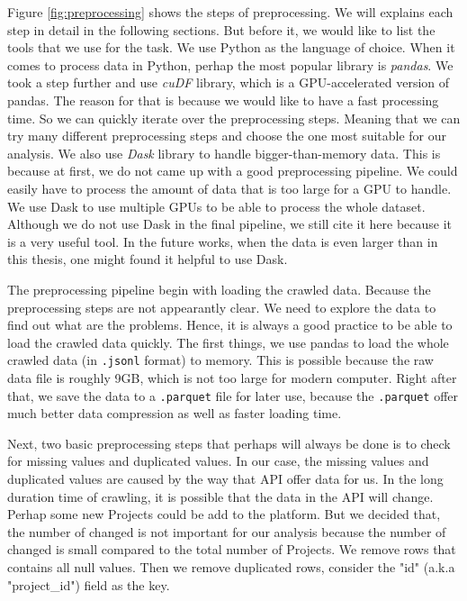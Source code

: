 Figure \ref{fig:preprocessing} shows the steps of preprocessing.
We will explains each step in detail in the following sections.
But before it, we would like to list the tools that we use for the task.
We use Python as the language of choice.
When it comes to process data in Python, perhap the most popular library is \textit{pandas}\cite{pandas}.
We took a step further and use \textit{cuDF}\cite{cudf} library, which is a GPU-accelerated version of pandas.
The reason for that is because we would like to have a fast processing time.
So we can quickly iterate over the preprocessing steps.
Meaning that we can try many different preprocessing steps and choose the one most suitable for our analysis.
We also use \textit{Dask}\cite{dask} library to handle bigger-than-memory data.
This is because at first, we do not came up with a good preprocessing pipeline.
We could easily have to process the amount of data that is too large for a GPU to handle.
We use Dask to use multiple GPUs to be able to process the whole dataset.
Although we do not use Dask in the final pipeline, we still cite it here because it is a very useful tool.
In the future works, when the data is even larger than in this thesis, one might found it helpful to use Dask.

The preprocessing pipeline begin with loading the crawled data.
Because the preprocessing steps are not appearantly clear.
We need to explore the data to find out what are the problems.
Hence, it is always a good practice to be able to load the crawled data quickly.
The first things, we use pandas to load the whole crawled data (in \lstinline|.jsonl| format) to memory.
This is possible because the raw data file is roughly 9GB, which is not too large for modern computer.
Right after that, we save the data to a \lstinline|.parquet| file for later use,
because the \lstinline|.parquet| offer much better data compression as well as faster loading time.

Next, two basic preprocessing steps that perhaps will always be done is to check for missing values and duplicated values.
In our case, the missing values and duplicated values are caused by the way that API offer data for us.
In the long duration time of crawling, it is possible that the data in the API will change.
Perhap some new Projects could be add to the platform.
But we decided that, the number of changed is not important for our analysis because the number of changed is small compared to the total number of Projects.
We remove rows that contains all null values.
Then we remove duplicated rows, consider the "id" (a.k.a "project\_id") field as the key.

